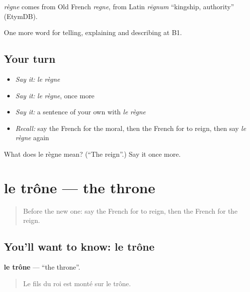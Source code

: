 \begin{cousinweb}
\emph{règne} comes from Old French \emph{regne}, from Latin \emph{rēgnum} \textquotedblleft{}kingship, authority\textquotedblright{} (EtymDB).
\end{cousinweb}

\begin{grammarlens}[title={What you've built}]
One more word for telling, explaining and describing at B1.
\end{grammarlens}

\subsection*{Your turn}
\begin{itemize}
\raggedright
  \item \emph{Say it:} \emph{le règne}
  \item \emph{Say it:} \emph{le règne}, once more
  \item \emph{Say it:} a sentence of your own with \emph{le règne}
  \item \emph{Recall:} say the French for the moral, then the French for to reign, then say \emph{le règne} again
\end{itemize}

\begin{tcolorbox}[breakable,colback=teal!4,colframe=teal!35!black,title={Before you move on}]
What does le règne mean? (\textquotedblleft{}The reign\textquotedblright{}.) Say it once more.
\end{tcolorbox}
\section[le trône]{le trône — the throne}

\label{lesson:FR-C323-trone}



\begin{quote}
Before the new one: say the French for to reign, then the French for the reign.
\end{quote}

\subsection*{You'll want to know: le trône}
\textbf{le trône} — \textquotedblleft{}the throne\textquotedblright{}.

\begin{quote}
Le fils du roi est monté sur le trône.
\end{quote}

